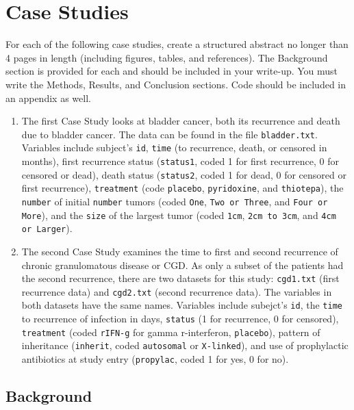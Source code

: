\documentclass{article}
\begin{document}
	\newpage
	\section*{Case Studies}
	For each of the following case studies, create a structured abstract no longer than 4 pages in length (including figures, tables, and references). The Background section is provided for each and should be included in your write-up. You must write the Methods, Results, and Conclusion sections. Code should be included in an appendix as well.

	\begin{enumerate}
		\item The first Case Study looks at bladder cancer, both its recurrence and death due to bladder cancer. The data can be found in the file \texttt{bladder.txt}. Variables include subject's \texttt{id}, \texttt{time} (to recurrence, death, or censored in months), first recurrence status (\texttt{status1}, coded 1 for first recurrence, 0 for censored or dead), death status (\texttt{status2}, coded 1 for dead, 0 for censored or first recurrence), \texttt{treatment} (code \texttt{placebo}, \texttt{pyridoxine}, and \texttt{thiotepa}), the \texttt{number} of initial \texttt{number} tumors (coded \texttt{One}, \texttt{Two or Three}, and \texttt{Four or More}), and the \texttt{size} of the largest tumor (coded \texttt{1cm}, \texttt{2cm to 3cm}, and \texttt{4cm or Larger}).
		
		\item The second Case Study examines the time to first and second recurrence of chronic granulomatous disease or CGD. As only a subset of the patients had the second recurrence, there are two datasets for this study: \texttt{cgd1.txt} (first recurrence data) and \texttt{cgd2.txt} (second recurrence data). The variables in both datasets have the same names. Variables include subejct's \texttt{id}, the \texttt{time} to recurrence of infection in days, \texttt{status} (1 for recurrence, 0 for censored), \texttt{treatment} (coded \texttt{rIFN-g} for gamma r-interferon, \texttt{placebo}), pattern of inheritance (\texttt{inherit}, coded \texttt{autosomal} or \texttt{X-linked}), and use of prophylactic antibiotics at study entry (\texttt{propylac}, coded 1 for yes, 0 for no).	
	\end{enumerate}

	\newpage
	\subsection*{Background} %
\end{document}

